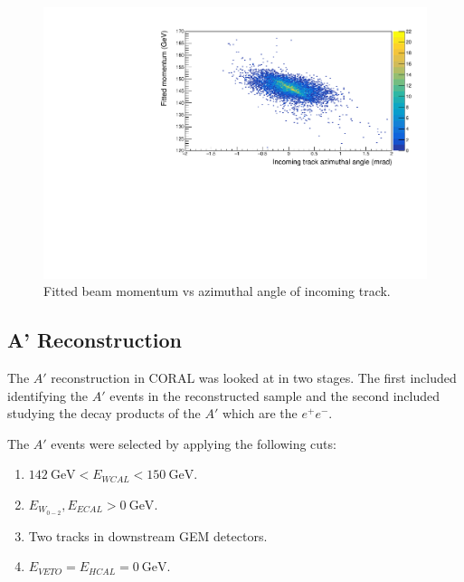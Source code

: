  \begin{figure}[h!]
 \centering
 \includegraphics[width=\textwidth]{thesis_figures/MC_reco/mom_vs_azi.pdf}
 \caption{Fitted beam momentum vs azimuthal angle of incoming track.}
 \label{fig:reco_mom_azi}
 \end{figure}
\newpage

 \subsection{A' Reconstruction}
 \label{subsec:a'_reco}
The $A'$ reconstruction in CORAL was looked at in two stages. The first included identifying the $A'$ events in the reconstructed sample and the second included studying the decay products of the $A'$ which are the $e^+ e^-$.

The $A'$ events were selected by applying the following cuts:
\begin{enumerate}
  \item $142~\text{GeV} < E_{WCAL} < 150~\text{GeV} $.
  \item $E_{W_{0-2}}, E_{ECAL} > 0~\text{GeV}$.
  \item Two tracks in downstream GEM detectors.
  \item $E_{VETO} = E_{HCAL} = 0~\text{GeV} $.
\end{enumerate}

